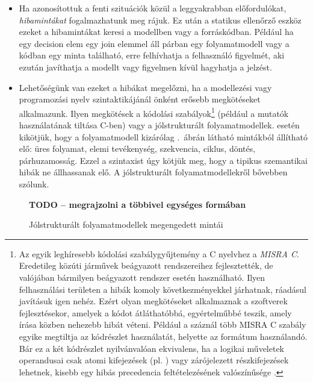 \begin{itemize}
	\item Ha azonosítottuk a fenti szituációk közül a leggyakrabban előfordulókat, \emph{hibamintákat} fogalmazhatunk meg rájuk. Ez után a statikus ellenőrző eszköz ezeket a hibamintákat keresi a modellben vagy a forráskódban. Például ha egy decision elem egy join elemmel áll párban egy folyamatmodell vagy a kódban egy  minta található, erre felhívhatja a felhasználó figyelmét, aki ezután javíthatja a modellt vagy figyelmen kívül hagyhatja a jelzést.

	\item Lehetőségünk van ezeket a hibákat megelőzni, ha a modellezési vagy programozási nyelv szintaktikájánál önként erősebb megkötéseket alkalmazunk. Ilyen megkötések a kódolási szabályok\footnote{Az egyik leghíresebb kódolási szabálygyűjtemény a C nyelvhez a \emph{MISRA C}. Eredetileg közúti járművek beágyazott rendszereihez fejlesztették, de valójában bármilyen beágyazott rendszer esetén használható. Ilyen felhasználási területen a hibák komoly következményekkel járhatnak, ráadásul javításuk igen nehéz. Ezért olyan megkötéseket alkalmaznak a szoftverek fejlesztésekor, amelyek a kódot átláthatóbbá, egyértelműbbé teszik, amely írása közben nehezebb hibát véteni. Például a száznál több MISRA C szabály egyike megtiltja az  kódrészlet használatát, helyette az  formátum használandó. Bár ez a két kódrészlet nyilvánvalóan ekvivalens, ha a logikai műveletek operandusai csak atomi kifejezések (pl. ) vagy zárójelezett részkifejezések lehetnek, kisebb egy hibás precedencia feltételezésének valószínűsége \cite{Wong:2003}.\kiegeszitoanyag} (például a mutatók használatának tiltása C-ben) vagy a jólstrukturált folyamatmodellek.  esetén kikötjük, hogy a folyamatmodell kizárólag .~ábrán látható mintákból állítható elő: üres folyamat, elemi tevékenység, szekvencia, ciklus, döntés, párhuzamosság. Ezzel a szintaxist úgy kötjük meg, hogy a tipikus szemantikai hibák ne állhassanak elő. A jólstrukturált folyamatmodellekről bővebben  szólunk.
\end{itemize}

\begin{figure}[h]
	\centering
	\textbf{TODO -- megrajzolni a többivel egységes formában}
	
	\caption{Jólstrukturált folyamatmodellek megengedett mintái}
	\label{fig:jolstrukturalt-folyamatmodellek-mintai}
\end{figure}

